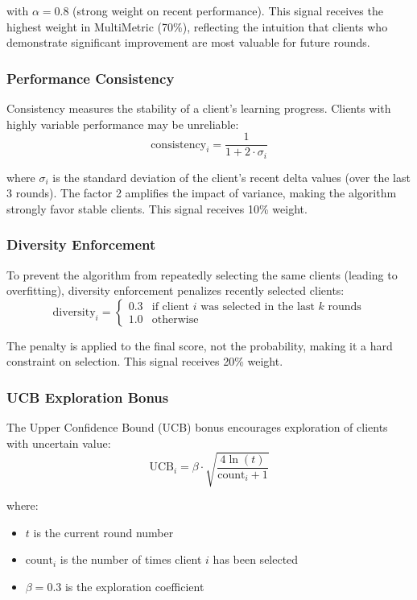 with \(\alpha = 0.8\) (strong weight on recent performance). This signal receives the highest weight in MultiMetric (70\%), reflecting the intuition that clients who demonstrate significant improvement are most valuable for future rounds.

\subsubsection{Performance Consistency}

Consistency measures the stability of a client's learning progress. Clients with highly variable performance may be unreliable:
\[
\text{consistency}_i = \frac{1}{1 + 2 \cdot \sigma_i}
\]

where \(\sigma_i\) is the standard deviation of the client's recent delta values (over the last 3 rounds). The factor 2 amplifies the impact of variance, making the algorithm strongly favor stable clients. This signal receives 10\% weight.

\subsubsection{Diversity Enforcement}

To prevent the algorithm from repeatedly selecting the same clients (leading to overfitting), diversity enforcement penalizes recently selected clients:
\[
\text{diversity}_i = 
\begin{cases} 
0.3 & \text{if client } i \text{ was selected in the last } k \text{ rounds} \\
1.0 & \text{otherwise}
\end{cases}
\]

The penalty is applied to the final score, not the probability, making it a hard constraint on selection. This signal receives 20\% weight.

\subsubsection{UCB Exploration Bonus}

The Upper Confidence Bound (UCB) bonus encourages exploration of clients with uncertain value:
\[
\text{UCB}_i = \beta \cdot \sqrt{\frac{4 \ln(t)}{\text{count}_i + 1}}
\]

where:
\begin{itemize}
    \item \(t\) is the current round number
    \item \(\text{count}_i\) is the number of times client \(i\) has been selected
    \item \(\beta = 0.3\) is the exploration coefficient
\end{itemize}

